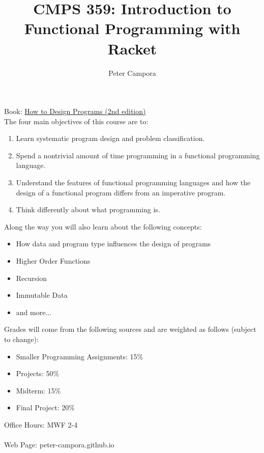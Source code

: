 \documentclass{article}
\begin{document}
\title{CMPS 359: Introduction to Functional Programming with Racket}
\author{Peter Campora}
%
\maketitle

\noindent Book: \href{https://htdp.org/2019-02-24/index.html}{How to Design Programs (2nd edition)}\\

\noindent The four main objectives of this course are to:
%
\begin{enumerate}
\item Learn systematic program design and problem classification.
\item Spend a nontrivial amount of time programming in a functional programming language.
\item Understand the features of functional programming languages and how the design of a functional
  program differs from an imperative program.
\item Think differently about what programming is.
\end{enumerate}

\noindent Along the way you will also learn about the following concepts:
\begin{itemize}
\item How data and program type influences the design of programs
\item Higher Order Functions
\item Recursion
\item Immutable Data
\item and more...
\end{itemize}

\noindent Grades will come from the following sources and are weighted as follows (subject to change):
\begin{itemize}
\item Smaller Programming Assignments: 15\%
\item Projects: 50\%
\item Midterm: 15\%
\item Final Project: 20\%
\end{itemize}

\noindent Office Hours: MWF 2-4\\\\
Web Page: peter-campora.github.io
\end{document}
